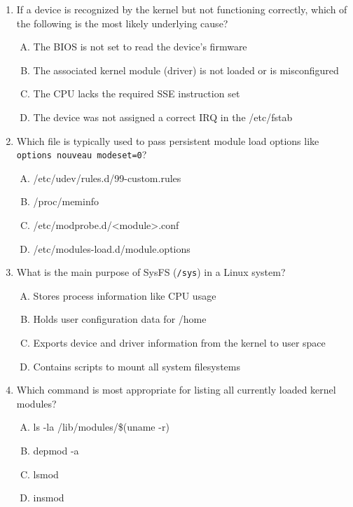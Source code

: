 \documentclass[12pt,a4paper]{report}
\begin{document}
\begin{enumerate}[1.]
\item If a device is recognized by the kernel but not functioning correctly, which of the following is the most likely underlying cause?
  \begin{enumerate}[A)]
    \item The BIOS is not set to read the device's firmware
    \item The associated kernel module (driver) is not loaded or is misconfigured
    \item The CPU lacks the required SSE instruction set
    \item The device was not assigned a correct IRQ in the /etc/fstab
  \end{enumerate}

\item Which file is typically used to pass persistent module load options like \texttt{options nouveau modeset=0}?
  \begin{enumerate}[A)]
    \item /etc/udev/rules.d/99-custom.rules
    \item /proc/meminfo
    \item /etc/modprobe.d/<module>.conf
    \item /etc/modules-load.d/module.options
  \end{enumerate}

\item What is the main purpose of SysFS (\texttt{/sys}) in a Linux system?
  \begin{enumerate}[A)]
    \item Stores process information like CPU usage
    \item Holds user configuration data for /home
    \item Exports device and driver information from the kernel to user space
    \item Contains scripts to mount all system filesystems
  \end{enumerate}

\item Which command is most appropriate for listing all currently loaded kernel modules?
  \begin{enumerate}[A)]
    \item ls -la /lib/modules/\$(uname -r)
    \item depmod -a
    \item lsmod
    \item insmod
  \end{enumerate}


\end{enumerate}
\end{document}
